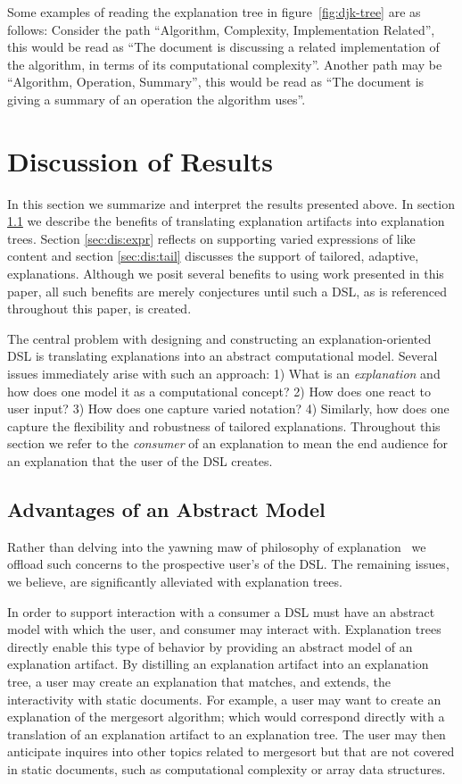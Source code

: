 \documentclass[sigconf]{acmart}
\begin{document}
Some examples of reading the explanation tree in figure~\ref{fig:djk-tree} are
as follows: Consider the path ``Algorithm, Complexity, Implementation Related'',
this would be read as ``The document is discussing a related implementation of
the algorithm, in terms of its computational complexity''. Another path may be
``Algorithm, Operation, Summary'', this would be read as ``The document is
giving a summary of an operation the algorithm uses''.

\section{Discussion of Results}
\label{sec:dis}
In this section we summarize and interpret the results presented above. In
section \ref{sec:dis:model} we describe the benefits of translating explanation
artifacts into explanation trees. Section \ref{sec:dis:expr} reflects on
supporting varied expressions of like content and section \ref{sec:dis:tail}
discusses the support of tailored, adaptive, explanations. Although we posit
several benefits to using work presented in this paper, all such benefits are
merely conjectures until such a DSL, as is referenced throughout this paper, is
created. 

The central problem with designing and constructing an explanation-oriented DSL
is translating explanations into an abstract computational model. Several issues
immediately arise with such an approach: 1) What is an \emph{explanation} and
how does one model it as a computational concept? 2) How does one react to user
input? 3) How does one capture varied notation? 4) Similarly, how does one
capture the flexibility and robustness of tailored explanations. Throughout this
section we refer to the \emph{consumer} of an explanation to mean the end
audience for an explanation that the user of the DSL creates.

\subsection{Advantages of an Abstract Model}
\label{sec:dis:model}

Rather than delving into the yawning maw of philosophy of
explanation~\cite{sep-scientific-explanation} we offload such concerns to the
prospective user's of the DSL. The remaining issues, we believe, are
significantly alleviated with explanation trees.

In order to support interaction with a consumer a DSL must have an abstract
model with which the user, and consumer may interact with. Explanation trees
directly enable this type of behavior by providing an abstract model of an
explanation artifact.
%
By distilling an explanation artifact into an explanation tree, a user may
create an explanation that matches, and extends, the interactivity with static
documents. For example, a user may want to create an explanation of the
mergesort algorithm; which would correspond directly with a translation of an
explanation artifact to an explanation tree. The user may then anticipate
inquires into other topics related to mergesort but that are not covered in
static documents, such as computational complexity or array data structures.
\end{document}
